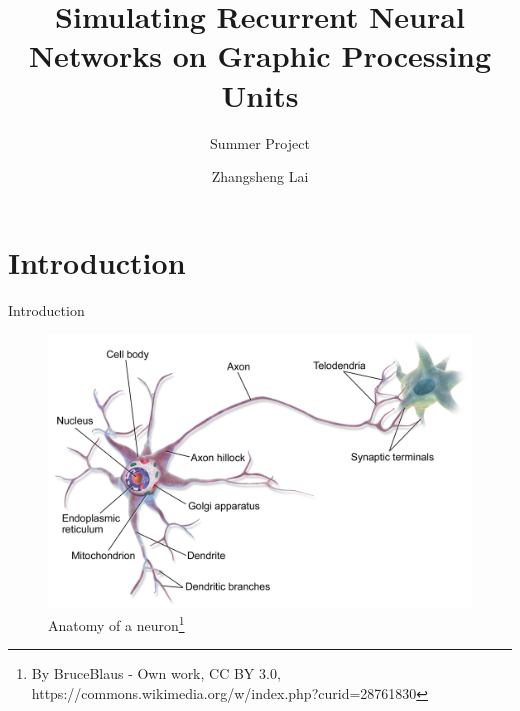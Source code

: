 \documentclass[10pt,appendixnumberbeamer]{beamer}
\title{Simulating Recurrent Neural Networks on Graphic Processing Units}
\subtitle{Summer Project}
\author{Zhangsheng Lai}
\begin{document}
\begin{frame}
\titlepage
\end{frame}



\section{Introduction}

\begin{frame}{Introduction}
\begin{figure}[h]
\includegraphics[scale=0.1]{Blausen_0657_MultipolarNeuron.png}
\caption{Anatomy of a neuron\footnote{By BruceBlaus - Own work, CC BY 3.0, https://commons.wikimedia.org/w/index.php?curid=28761830}}

\end{figure}


\end{frame}


%

\end{document}

